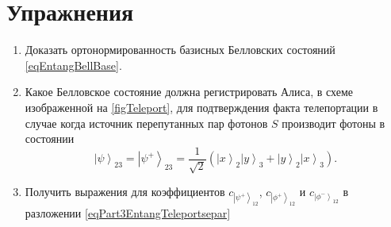 %













\section{Упражнения}
\begin{enumerate}
\item Доказать ортонормированность базисных Белловских состояний
  \eqref{eqEntangBellBase}. 
\item Какое Белловское состояние должна регистрировать Алиса, в схеме
  изображенной на \autoref{figTeleport}, для
  подтверждения факта телепортации в случае когда источник
  перепутанных пар фотонов $S$ производит фотоны в состоянии 
\begin{equation}
  \left|\psi\right>_{23} = \left|\psi^{+}\right>_{23} = \frac{1}{\sqrt{2}}\left(
  \left|x\right>_2\left|y\right>_3 +
  \left|y\right>_2\left|x\right>_3
  \right).
  \nonumber
\end{equation}
\item Получить выражения для коэффициентов 
$c_{\left|\psi^{+}\right>_{12}}$, 
$c_{\left|\phi^{+}\right>_{12}}$ и 
$c_{\left|\phi^{-}\right>_{12}}$
в разложении \eqref{eqPart3EntangTeleportsepar}
\end{enumerate}
